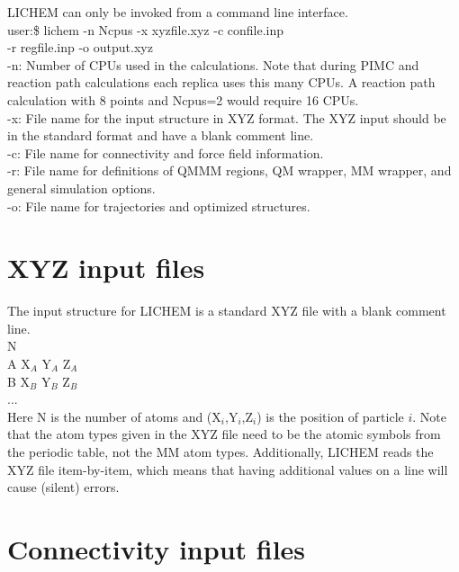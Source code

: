 \documentclass[12pt]{report}
\begin{document}
LICHEM can only be invoked from a command line interface. \\

user:\$ lichem -n Ncpus -x xyzfile.xyz -c confile.inp \\

-r regfile.inp -o output.xyz \\

-n: Number of CPUs used in the calculations. Note that during PIMC and
reaction path calculations each replica uses this many CPUs. A reaction
path calculation with 8 points and Ncpus=2 would require 16 CPUs. \\

-x: File name for the input structure in XYZ format. The XYZ input should be
in the standard format and have a blank comment line. \\

-c: File name for connectivity and force field information. \\

-r: File name for definitions of QMMM regions, QM wrapper, MM wrapper,
and general simulation options. \\

-o: File name for trajectories and optimized structures.

\section{XYZ input files}

The input structure for LICHEM is a standard XYZ file with a blank comment
line. \\

N \\

A  X$_A$  Y$_A$  Z$_A$ \\
B  X$_B$  Y$_B$  Z$_B$ \\
... \\

Here N is the number of atoms and (X$_i$,Y$_i$,Z$_i$) is the position of
particle $i$. Note that the atom types given in the XYZ file need to be the
atomic symbols from the periodic table, not the MM atom types. Additionally,
LICHEM reads the XYZ file item-by-item, which means that having additional
values on a line will cause (silent) errors.

\section{Connectivity input files}
\end{document}

